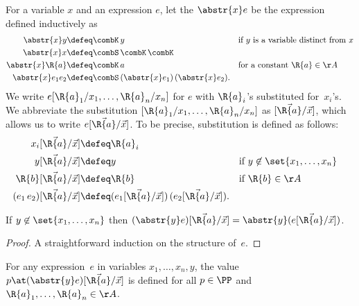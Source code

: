 For a variable $x$ and an expression $e$, let the  $\abstr{x} e$ be the expression defined inductively as
%
\begin{align*}
  \abstr{x} y &\defeq \combK \, y & &\text{if $y$ is a variable distinct from $x$} \\
  \abstr{x} x &\defeq \combS \, \combK \, \combK \\
  \abstr{x} \R{a} &\defeq \combK \, a & &\text{for a constant $\R{a} \in \AA$} \\
  \abstr{x} e_1 e_2 &\defeq \combS \, (\abstr{x} e_1) \, (\abstr{x} e_2).
\end{align*}
%
We write $e[\R{a}_1/x_1, \ldots, \R{a}_n/x_n]$ for $e$ with $\R{a}_i$'s substituted for~$x_i$'s. We abbreviate the substitution $[\R{a}_1/x_1, \ldots, \R{a}_n/x_n]$ as $[\vec{\R{a}}/\vec{x}]$, which allows us to write $e[\vec{\R{a}}/\vec{x}]$. To be precise, substitution is defined as follows:
%
\begin{align*}
  x_i [\vec{\R{a}}/\vec{x}] &\defeq \R{a}_i \\
  y [\vec{\R{a}}/\vec{x}] &\defeq y &&\text{if $y \not\in \set{x_1, \ldots, x_n}$} \\
  \R{b} [\vec{\R{a}}/\vec{x}] &\defeq \R{b} &&\text{if $\R{b} \in \AA$} \\
  (e_1 \, e_2) [\vec{\R{a}}/\vec{x}] &\defeq (e_1[\vec{\R{a}}/\vec{x}]) \, (e_2[\vec{\R{a}}/\vec{x}]).
\end{align*}

\begin{lemma}
  \label{lem:abstr-subst-commute}%
  If $y \not\in \set{x_1, \ldots, x_n}$ then $(\abstr{y} e)[\vec{\R{a}}/\vec{x}] = \abstr{y} (e[\vec{\R{a}}/\vec{x}])$.
\end{lemma}

\begin{proof}
  A straightforward induction on the structure of~$e$.
\end{proof}


\begin{lemma}
  \label{lem:abstr-p-defined}
  For any expression~$e$ in variables $x_1, \ldots, x_n, y$, the value $p \at (\abstr{y} e)[\vec{\R{a}}/\vec{x}]$ is defined for all $p \in \PP$ and $\R{a}_1, \ldots, \R{a}_n \in \AA$.
\end{lemma}

